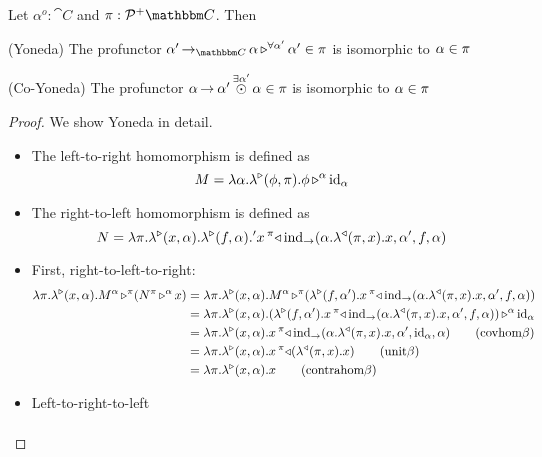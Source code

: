 \documentclass{llncs}
\begin{document}
\begin{lemma}
  Let $\alpha^o : \cat C$ and $\pi : \posPresheaf {\cat C}$. Then
  \item (Yoneda) The profunctor $\homrallXYtoZ {\alpha'} {\punitinXfromYtoZ {\cat C} {\alpha'}{\alpha}} {\negPresheafAppPtoX \pi {\alpha'}}$ is isomorphic to $\negPresheafAppPtoX \pi \alpha$
  \item (Co-Yoneda) The profunctor $\tensorexistsXwithYandZ {\alpha'}{\punitinXfromYtoZ{}{\alpha}{\alpha'}} {\negPresheafAppPtoX \pi \alpha}$ is isomorphic to $\negPresheafAppPtoX \pi \alpha$
\end{lemma}
\begin{proof}
  We show Yoneda in detail.
  \begin{itemize}
  \item The left-to-right homomorphism is defined as
    \[ M = \lambdaunary {\alpha} {\phi} \pi {\homrappXtoYatZ {\phi} {\punitrefl {\alpha}} \alpha} \]
  \item The right-to-left homomorphism is defined as
    \[ N = \lambdabinary \pi x \alpha f \alpha' {\homlappXtoYatZ {\punitelimkontZatABC {\alpha. \homllambdaXatYdotZ x \pi x} {\alpha'} f {\alpha}} x \pi}\]
  \item First, right-to-left-to-right:
    \begin{align*}
      \lambdaunary \pi x \alpha {\appunary M {\alpha} {(\appunary N \pi x \alpha)} \pi}
      &= \lambdaunary \pi x \alpha {\appunary M {\alpha} {({\homrlambdaXatYdotZ f {\alpha'} {{\homlappXtoYatZ {\punitelimkontZatABC {\alpha. \homllambdaXatYdotZ x \pi x} {\alpha'} f {\alpha}} x \pi}}})} \pi}\\
      &= \lambdaunary \pi x \alpha {\homrappXtoYatZ {({\homrlambdaXatYdotZ f {\alpha'} {{\homlappXtoYatZ {\punitelimkontZatABC {\alpha. \homllambdaXatYdotZ x \pi x} {\alpha'} f {\alpha}} x \pi}}})} {\punitrefl \alpha} \alpha}\\
      &= \lambdaunary \pi x \alpha {{\homlappXtoYatZ {\punitelimkontZatABC {\alpha. \homllambdaXatYdotZ x \pi x} {\alpha'} {\punitrefl \alpha} {\alpha}} x \pi}}\tag{covhom$\beta$}\\
      &= \lambdaunary \pi x \alpha {{\homlappXtoYatZ {(\homllambdaXatYdotZ x \pi x)} x \pi}}\tag{unit$\beta$}\\
      &= \lambdaunary \pi x \alpha {x}\tag{contrahom$\beta$}\\
    \end{align*}
  \item Left-to-right-to-left
    \begin{align*}

\end{align*}
\end{itemize}
\end{proof}
\end{document}
